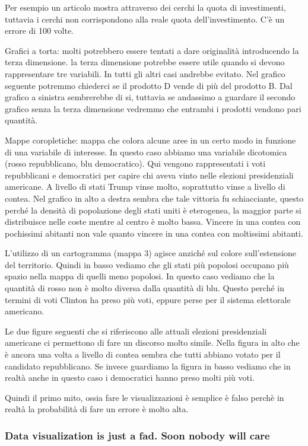 \documentclass[12pt,a4paper]{report}
\begin{document}
Per esempio un articolo mostra attraverso dei cerchi la quota di investimenti, tuttavia i cerchi non corrispondono alla reale quota dell'investimento. C'è un errore di 100 volte.

Grafici a torta: molti potrebbero essere tentati a dare originalità introducendo la terza dimensione. la terza dimensione potrebbe essere utile quando si devono rappresentare tre variabili. In tutti gli altri casi andrebbe evitato. Nel grafico seguente potremmo chiederci se il prodotto D vende di più del prodotto B. Dal grafico a sinistra sembrerebbe di si, tuttavia se andassimo a guardare il secondo grafico senza la terza dimensione vedremmo che entrambi i prodotti vendono pari quantità. 

Mappe coropletiche: mappa che colora alcune aree in un certo modo in funzione di una variabile di interesse. In questo caso abbiamo una variabile dicotomica (rosso repubblicano, blu democratico). Qui vengono rappresentati i voti repubblicani e democratici per capire chi aveva vinto nelle elezioni presidenziali americane. A livello di stati Trump vinse molto, soprattutto vinse a livello di contea. Nel grafico in alto a destra sembra che tale vittoria fu schiacciante, questo perché la densità di popolazione degli stati uniti è eterogenea, la maggior parte si distribuisce nelle coste mentre al centro è molto bassa. Vincere in una contea con pochissimi abitanti non vale quanto vincere in una contea con moltissimi abitanti. 

L'utilizzo di un cartogramma (mappa 3) agisce anziché sul colore sull'estensione del territorio. Quindi in basso vediamo che gli stati più popolosi occupano più spazio nella mappa di quelli meno popolosi. In questo caso vediamo che la quantità di rosso non è molto diversa dalla quantità di blu. Questo perché in termini di voti Clinton ha preso più voti, eppure perse per il sistema elettorale americano. 


Le due figure seguenti che si riferiscono alle attuali elezioni presidenziali americane ci permettono di fare un discorso molto simile. Nella figura in alto che è ancora una volta a livello di contea sembra che tutti abbiano votato per il candidato repubblicano. Se invece guardiamo la figura in basso vediamo che in realtà anche in questo caso i democratici hanno preso molti più voti. 

Quindi il primo mito, ossia fare le visualizzazioni è semplice è falso perchè in realtà la probabilità di fare un errore è molto alta. 

\subsubsection{Data visualization is just a fad. Soon nobody will care}
\end{document}
